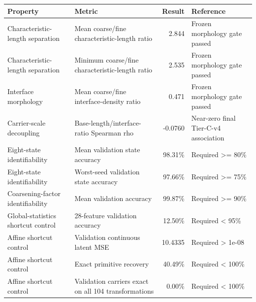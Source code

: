 \begin{tabular}{llrl}
\toprule
Property & Metric & Result & Reference \\
\midrule
Characteristic-length separation & Mean coarse/fine characteristic-length ratio & 2.844 & Frozen morphology gate passed \\
Characteristic-length separation & Minimum coarse/fine characteristic-length ratio & 2.535 & Frozen morphology gate passed \\
Interface morphology & Mean coarse/fine interface-density ratio & 0.471 & Frozen morphology gate passed \\
Carrier-scale decoupling & Base-length/interface-ratio Spearman rho & -0.0760 & Near-zero final Tier-C-v4 association \\
Eight-state identifiability & Mean validation state accuracy & 98.31\% & Required >= 80\% \\
Eight-state identifiability & Worst-seed validation state accuracy & 97.66\% & Required >= 75\% \\
Coarsening-factor identifiability & Mean validation accuracy & 99.87\% & Required >= 90\% \\
Global-statistics shortcut control & 28-feature validation accuracy & 12.50\% & Required < 95\% \\
Affine shortcut control & Validation continuous latent MSE & 10.4335 & Required > 1e-08 \\
Affine shortcut control & Exact primitive recovery & 40.49\% & Required < 100\% \\
Affine shortcut control & Validation carriers exact on all 104 transformations & 0.00\% & Required < 100\% \\
\bottomrule
\end{tabular}
